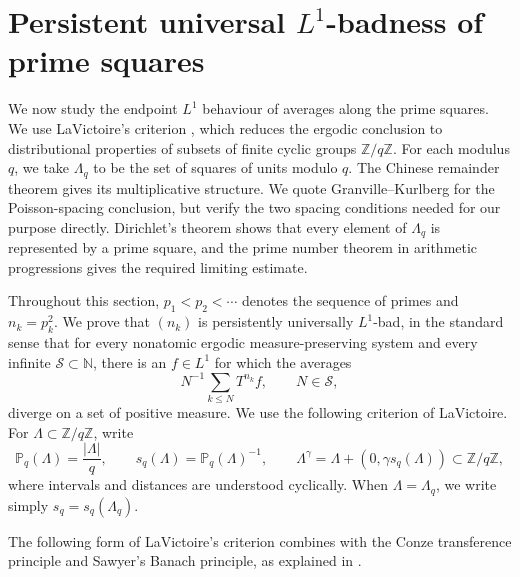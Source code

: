 \documentclass[12pt,reqno]{amsart}
\numberwithin{equation}{section}
\theoremstyle{definition}
\theoremstyle{remark}
\begin{document}
\section{Persistent universal \(L^1\)-badness of prime squares}
\label{s:l1}




We now study the endpoint \(L^1\) behaviour of averages along the prime
squares.  We use LaVictoire's criterion \cite{L09}, which reduces the
ergodic conclusion to distributional properties of subsets of finite
cyclic groups \(\mathbb Z/q\mathbb Z\).  For each modulus \(q\), we take
\(\Lambda_q\) to be the set of squares of units modulo \(q\).  The Chinese remainder theorem gives its multiplicative structure.
We quote Granville--Kurlberg \cite{GK08} for the Poisson-spacing
conclusion, but verify the two spacing conditions needed for our purpose
directly. Dirichlet's theorem shows that every
element of \(\Lambda_q\) is represented by a prime square, and the prime
number theorem in arithmetic progressions gives the required limiting
estimate.

Throughout this section, $p_1<p_2<\cdots$ denotes the sequence of primes and $n_k=p_k^2.$
We prove that $(n_k)$ is persistently universally $L^1$-bad, in the standard
sense that for every nonatomic ergodic measure-preserving system and every
infinite $\mathcal S\subset\mathbb N$, there is an $f\in L^1$ for which the
averages 
$$N^{-1}\sum_{k\leq N} T^{n_k}f, \qquad N\in\mathcal S, $$ 
diverge on a
set of positive measure.  We use the following criterion of LaVictoire.
For $\Lambda\subset\mathbb Z/q\mathbb Z$, write
\[
 \mathbb P_q(\Lambda)=\frac{|\Lambda|}{q},\qquad
 s_q(\Lambda)=\mathbb P_q(\Lambda)^{-1},\qquad
 \Lambda^\gamma
 =\Lambda+(0,\gamma s_q(\Lambda))\subset\mathbb Z/q\mathbb Z,
\]
where intervals and distances are understood cyclically.  When
\(\Lambda=\Lambda_q\), we write simply \(s_q=s_q(\Lambda_q)\).

The following form of LaVictoire's criterion combines
\cite[Theorem~3.1]{L09} with the Conze transference principle and
Sawyer's Banach principle, as explained in \cite[Section~1]{L09}.
\end{document}
